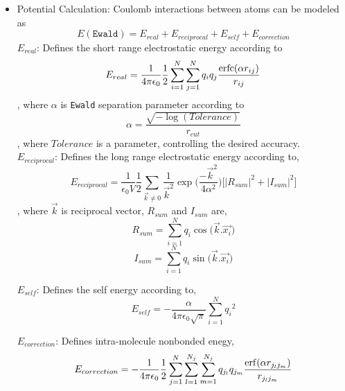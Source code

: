 \begin{itemize}
	\item Potential Calculation: Coulomb interactions between atoms can be modeled as
	\begin{equation}
		E(\texttt{Ewald}) = E_{real} + E_{reciprocal} + E_{self} + E_{correction}
	\end{equation}	
	$E_{real}$: Defines the short range electrostatic energy according to
	\begin{equation}
		E_{real} = \frac{1}{4\pi \epsilon_0} \frac{1}{2} \sum_{i =1}^{N} \sum_{j = 1}^{N} q_i q_j  \frac{\operatorname{erfc}(\alpha r_{ij})}{r_{ij}}
	\end{equation}
	, where $\alpha$ is \texttt{Ewald} separation parameter according to
	\begin{equation}
		\alpha = \frac {\sqrt{-\log (Tolerance)}}{r_{cut}}
	\end{equation}
	, where $Tolerance$ is a parameter, controlling the desired accuracy.\\

	$E_{reciprocal}$: Defines the long range electrostatic energy according to,
	\begin{equation}
		E_{reciprocal} = \frac{1}{\epsilon_0 V} \frac {1}{2} \sum_{\overrightarrow{k} \ne 0}^{} \frac {1}{\overrightarrow{k}^2}\exp\bigg(\frac {-\overrightarrow{k}^2}{4 \alpha^2}\bigg) \Bigg[ {\Big| R_{sum} \Big|}^2 + {\Big| I_{sum} \Big|}^2 \bigg]
	\end{equation}
	, where $\overrightarrow{k}$ is reciprocal vector, $R_{sum}$ and $I_{sum}$ are,
	\begin{equation}
	R_{sum} = \sum_{i=1}^{N} q_i \cos \big(\overrightarrow{k}.\overrightarrow{x_i}\big)
	\end{equation}
	\begin{equation}	
	I_{sum} = \sum_{i=1}^{N} q_i \sin \big(\overrightarrow{k}.\overrightarrow{x_i}\big)
	\end{equation}
	
	$E_{self}$: Defines the self energy according to,	
	\begin{equation}
	E_{self} = -\frac{\alpha}{4\pi \epsilon_0 \sqrt{\pi}} \sum_{i=1}^{N} {q_i}^2
	\end{equation}
	
	$E_{correction}$: Defines intra-molecule nonbonded enegy,	
	\begin{equation}
	E_{correction} = -\frac{1}{4\pi \epsilon_0} \frac{1}{2} \sum_{j=1}^{N }\sum_{l =1}^{N_j} \sum_{m = 1}^{N_j} q_{j_l} q_{j_m}  \frac{\operatorname{erf}(\alpha r_{j_l j_m})}{r_{j_l j_m}}
	\end{equation}


\end{itemize}
